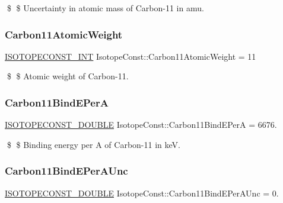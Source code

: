 \$ \$ Uncertainty in atomic mass of Carbon-\/11 in amu. \mbox{\label{group___isotope_const-_carbon-_c11_ga954dad0ec9d02335f810262bc8e8331b}} 
\subsubsection{\texorpdfstring{Carbon11\+Atomic\+Weight}{Carbon11AtomicWeight}}
{\footnotesize\ttfamily \mbox{\hyperlink{group___isotope_const-_macros_ga5f18360b3e99483a35c32d789e62621c}{I\+S\+O\+T\+O\+P\+E\+C\+O\+N\+S\+T\+\_\+\+I\+NT}} Isotope\+Const\+::\+Carbon11\+Atomic\+Weight = 11}

\$ \$ Atomic weight of Carbon-\/11. \mbox{\label{group___isotope_const-_carbon-_c11_ga684a6640ca05cd887139bfed79b2d651}} 
\subsubsection{\texorpdfstring{Carbon11\+Bind\+E\+PerA}{Carbon11BindEPerA}}
{\footnotesize\ttfamily \mbox{\hyperlink{group___isotope_const-_macros_ga8f45a7272ce02c0b4c65c44636ed719a}{I\+S\+O\+T\+O\+P\+E\+C\+O\+N\+S\+T\+\_\+\+D\+O\+U\+B\+LE}} Isotope\+Const\+::\+Carbon11\+Bind\+E\+PerA = 6676.}

\$ \$ Binding energy per A of Carbon-\/11 in keV. \mbox{\label{group___isotope_const-_carbon-_c11_ga6f9638650cb6f0a966dff00a5e79cdb1}} 
\subsubsection{\texorpdfstring{Carbon11\+Bind\+E\+Per\+A\+Unc}{Carbon11BindEPerAUnc}}
{\footnotesize\ttfamily \mbox{\hyperlink{group___isotope_const-_macros_ga8f45a7272ce02c0b4c65c44636ed719a}{I\+S\+O\+T\+O\+P\+E\+C\+O\+N\+S\+T\+\_\+\+D\+O\+U\+B\+LE}} Isotope\+Const\+::\+Carbon11\+Bind\+E\+Per\+A\+Unc = 0.}

